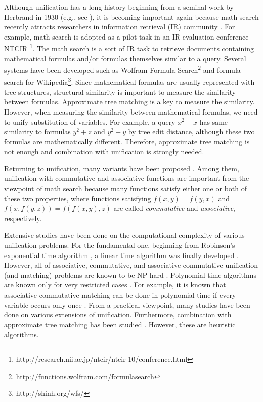\documentclass[a4paper]{llncs}
\begin{document}
Although unification has a long history beginning from a seminal work by
Herbrand in 1930 (e.g., see \cite{knight89}),
it is becoming important again because 
math search recently attracts researchers in information retrieval
(IR) community \cite{kamali10,kim12,nguyen12}.
For example, math search is adopted as a pilot task in an IR evaluation
conference
NTCIR \footnote{http://research.nii.ac.jp/ntcir/ntcir-10/conference.html}.
The math search is a sort of IR task to retrieve documents
containing mathematical formulas
and/or formulas themselves similar to a query.
Several systems have been developed such as
Wolfram Formula Search\footnote{http://functions.wolfram.com/formulasearch} and
formula search for Wikipedia\footnote{ http://shinh.org/wfs/}.
Since mathematical formulas are usually represented
with tree structures, structural similarity is important
to measure the similarity between formulas.
Approximate tree matching \cite{bille05} is
a key to measure the similarity.
However, when measuring the similarity between mathematical formulas,
we need to unify substitution of variables.
For example, a query $x^2 + x$ has same similarity to formulas
$y^2 + z$ and $y^2 + y$ by tree edit distance,
although these two formulas are mathematically different.
Therefore, approximate tree matching is not enough and 
combination with unification is strongly needed.

Returning to unification, many variants have been proposed
\cite{benanav87,kapur92,knight89}.
Among them, unification with commutative and associative functions
are important from the viewpoint of math search
because many functions satisfy either one or both of these two properties,
where functions satisfying $f(x,y)=f(y,x)$ and $f(x,f(y,z))=f(f(x,y),z)$
are called \emph{commutative} and \emph{associative}, respectively.

Extensive studies have been done on the computational complexity
of various unification problems.
For the fundamental one, beginning from Robinson's exponential time
algorithm \cite{robinson65},
a linear time algorithm was finally developed \cite{paterson78}.
However, all of associative, commutative, and associative-commutative
unification (and matching) problems are known to be
NP-hard \cite{benanav87,eker02,kapur92}.
Polynomial time algorithms are known only for very restricted cases
\cite{aikou05,benanav87,kapur92}.
For example, it is known that associative-commutative matching
can be done in polynomial time if
every variable occurs only once \cite{benanav87}.
From a practical viewpoint, many studies have been done on
various extensions of unification.
Furthermore, combination with approximate tree matching 
has been studied \cite{gilbert00,iranzo10}.
However, these are heuristic algorithms.
\end{document}
